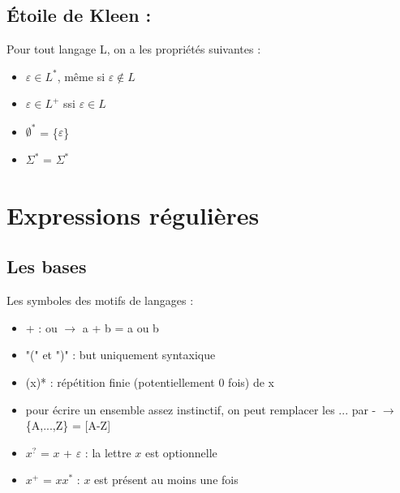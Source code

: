 \documentclass{article}
\begin{document}
\subsection{Étoile de Kleen :}
Pour tout langage L, on a les propriétés suivantes :
\begin{itemize}
    \item $\varepsilon \in L^{*}$, même si $\varepsilon \notin L$
    \item $\varepsilon \in L^{+}$ ssi $\varepsilon \in L$
    \item $\emptyset^{*}$ = \{$\varepsilon$\}
    \item $\Sigma^{*}$ = $\Sigma^{*}$
\end{itemize}
\newpage













\section{Expressions régulières}
\subsection{Les bases}
Les symboles des motifs de langages :
\begin{itemize}
    \item + : ou $\rightarrow$ a + b = a ou b
    \item "(" et ")" : but uniquement syntaxique
    \item (x)* : répétition finie (potentiellement 0 fois) de x
    \item pour écrire un ensemble assez instinctif, on peut remplacer les ... par - \newline $\rightarrow$ \{A,...,Z\} = [A-Z]
    \item $x^{?}$ = $x$ + $\varepsilon$ : la lettre $x$ est optionnelle
    \item $x^{+}$ = $xx^{*}$ : $x$ est présent au moins une fois
\end{itemize}
\end{document}
